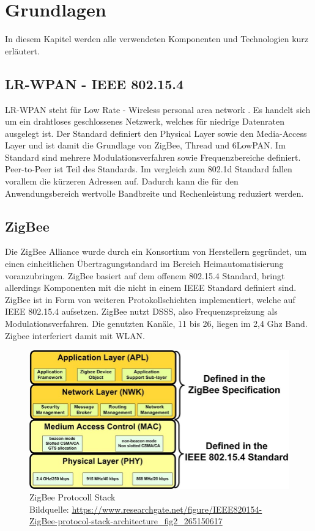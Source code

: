 \chapter{Grundlagen}

In diesem Kapitel werden alle verwendeten Komponenten und Technologien kurz erläutert.

\section{LR-WPAN - IEEE 802.15.4}

LR-WPAN steht für \grqq Low Rate - Wireless personal area network \grqq{}. Es handelt sich um ein drahtloses geschlossenes Netzwerk, welches für 
niedrige Datenraten ausgelegt ist. Der Standard definiert den Physical Layer sowie den Media-Access Layer und ist damit die Grundlage von ZigBee, Thread und 6LowPAN.
Im Standard sind mehrere Modulationsverfahren sowie Frequenzbereiche definiert. Peer-to-Peer ist Teil des Standards. Im vergleich zum 802.1d Standard fallen 
vorallem die kürzeren Adressen auf. Dadurch kann die für den Anwendungsbereich wertvolle Bandbreite und Rechenleistung reduziert werden. 

\section{ZigBee}

Die ZigBee Alliance wurde durch ein Konsortium von Herstellern gegründet, um einen einheitlichen Übertragungstandard
im Bereich Heimautomatisierung voranzubringen. ZigBee basiert auf dem offenem 802.15.4 Standard, bringt allerdings Komponenten mit die nicht in einem IEEE
Standard definiert sind.
ZigBee ist in Form von weiteren Protokollschichten implementiert, welche auf IEEE 802.15.4 aufsetzen. ZigBee nutzt DSSS, also Frequenzspreizung als Modulationsverfahren.
Die genutzten Kanäle, 11 bis 26, liegen im 2,4 Ghz Band. Zigbee interferiert damit mit WLAN.

\begin{figure}[H]
  \centering
  \includegraphics[width=1\textwidth]{media/Zigbee Stack.jpg}
  \caption{ZigBee Protocoll Stack \\ Bildquelle: \url{https://www.researchgate.net/figure/IEEE820154-ZigBee-protocol-stack-architecture_fig2_265150617}}
\end{figure}

